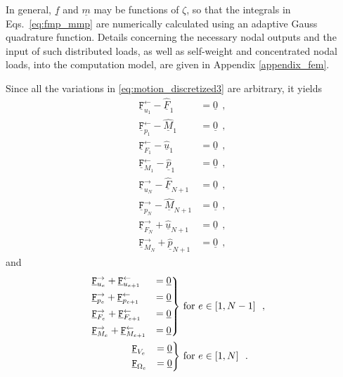 \documentclass[12pt,a4paper,oneside,english]{abntex2} %
\newcommand{\vect}[1]{\underline{#1}}
\def\u{\vect{u}}
\def\uhat{\widehat{\u}}
\def\p{\vect{p}}
\def\phat{\widehat{\p}}
\def\F{\vect{F}}
\def\Fhat{\widehat{\F}}
\def\M{\vect{M}}
\def\Mhat{\widehat{\M}}
\def\f{\vect{f}}
\def\m{\vect{m}}
\def\zv{\vect{0}}
\def\Fu{\mathtt{\vect{F}}_{u_e}}
\def\Fumone{\mathtt{\vect{F}}^\leftarrow_{u_1}}
\def\FupN{\mathtt{\vect{F}}^\rightarrow_{u_N}}
\def\Fupe{\Fu^\rightarrow}
\def\Fumepone{\mathtt{\vect{F}}_{u_{e+1}}^\leftarrow}
\def\Fp{\mathtt{\vect{F}}_{p_e}}
\def\Fpmone{\mathtt{\vect{F}}^\leftarrow_{p_1}}
\def\FppN{\mathtt{\vect{F}}^\rightarrow_{p_N}}
\def\Fppe{\Fp^\rightarrow}
\def\Fpmepone{\mathtt{\vect{F}}_{p_{e+1}}^\leftarrow}
\def\FF{\mathtt{\vect{F}}_{F_e}}
\def\FFmone{\mathtt{\vect{F}}^\leftarrow_{F_1}}
\def\FFpN{\mathtt{\vect{F}}^\rightarrow_{F_N}}
\def\FFpe{\FF^\rightarrow}
\def\FFmepone{\mathtt{\vect{F}}_{F_{e+1}}^\leftarrow}
\def\FM{\mathtt{\vect{F}}_{M_e}}
\def\FMmone{\mathtt{\vect{F}}^\leftarrow_{M_1}}
\def\FMpN{\mathtt{\vect{F}}^\rightarrow_{M_N}}
\def\FMpe{\FM^\rightarrow}
\def\FMmepone{\mathtt{\vect{F}}_{M_{e+1}}^\leftarrow}
\def\FV{\mathtt{\vect{F}}_{V_e}}
\def\FO{\mathtt{\vect{F}}_{\Omega_e}}
\begin{document}
In general, $\f$ and $\m$ may be functions of $\zeta$, so that the integrals in Eqs.~\eqref{eq:fmp_mmp} are numerically calculated using an adaptive Gauss quadrature function. Details concerning the necessary nodal outputs and the input of such distributed loads, as well as self-weight and concentrated nodal loads, into the computation model, are given in Appendix \ref{appendix_fem}.

Since all the variations in \cref{eq:motion_discretized3} are arbitrary, it yields 
\begin{equation}
    \begin{aligned}
        \Fumone - \Fhat_1 &= \zv  \ \ ,
        \\ 
        \Fpmone - \Mhat_1 &= \zv \ \ ,
        \\
        \FFmone - \uhat_1 &= \zv \ \ ,
        \\
        \FMmone - \phat_1 &= \zv \ \ ,
        \\
        \FupN - \Fhat_{N+1} &= \zv \ \ ,
        \\
        \FppN - \Mhat_{N+1} &= \zv \ \ ,
        \\
        \FFpN + \uhat_{N+1} &= \zv \ \ ,
        \\
        \FMpN + \phat_{N+1} &= \zv \ \ ,
        \label{eq:F_boundaries}
    \end{aligned}
\end{equation}
and 
\begin{equation}
\begin{aligned}
    \begin{rcases}
        \Fupe + \Fumepone &= \zv
        \\
        \Fppe + \Fpmepone &= \zv
        \\
        \FFpe + \FFmepone &= \zv
        \\
        \FMpe + \FMmepone &= \zv
    \end{rcases}
    &\text{ for } e \in [1,N-1] \ \ ,
    \\
    \begin{rcases}
        \FV &= \zv 
        \\
        \FO &= \zv
    \end{rcases}
    &\text{ for } e \in [1,N] \ \ .
    \label{eq:F_middle}
\end{aligned}
\end{equation}
\end{document}
